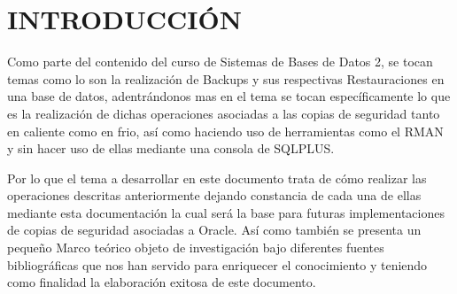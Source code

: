 \chapter*{INTRODUCCIÓN}

Como parte del contenido del curso de Sistemas de Bases de Datos 2, se tocan temas como lo son la realización de Backups y sus respectivas Restauraciones en una base de datos, adentrándonos mas en el tema se tocan específicamente lo que es la realización de dichas operaciones asociadas a las copias de seguridad tanto en caliente como en frio, así como haciendo uso de herramientas como el RMAN y sin hacer uso de ellas mediante una consola de SQLPLUS.

Por lo que el tema a desarrollar en este documento trata de cómo realizar las operaciones descritas anteriormente dejando constancia de cada una de ellas mediante esta documentación la cual será la base para futuras implementaciones de copias de seguridad asociadas a Oracle.
Así como también se presenta un pequeño Marco teórico objeto de investigación bajo diferentes fuentes bibliográficas que nos han servido para enriquecer el conocimiento y teniendo como finalidad la elaboración exitosa de este documento.